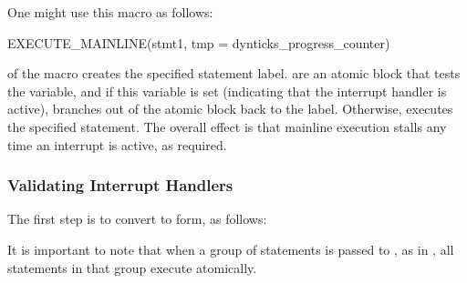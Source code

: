 

One might use this macro as follows:

\begin{VerbatimU}
EXECUTE_MAINLINE(stmt1,
                 tmp = dynticks_progress_counter)
\end{VerbatimU}

\begin{fcvref}
 of the macro creates the specified statement label.
 are an atomic block that tests
the 
variable, and if this variable is set (indicating that the interrupt
handler is active), branches out of the atomic block back to the
label.
Otherwise,  executes the specified statement.
The overall effect is that mainline execution stalls any time an interrupt
is active, as required.
\end{fcvref}

\subsubsection{Validating Interrupt Handlers}
\label{sec:formal:Validating Interrupt Handlers}

The first step is to convert  to
 form, as follows:



\begin{fcvref}
It is important to note that when a group of statements is passed
to , as in , all
statements in that group execute atomically.
\end{fcvref}

